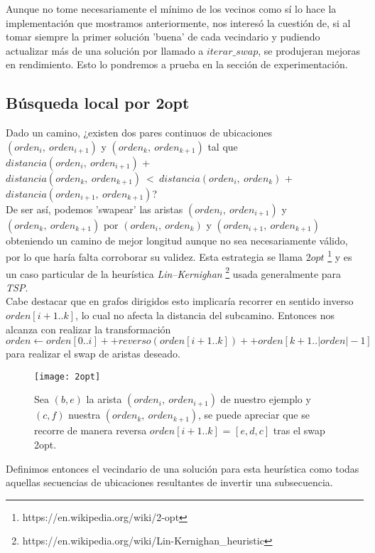     Aunque no tome necesariamente el mínimo de los vecinos como sí lo hace la implementación que mostramos anteriormente, nos interesó la cuestión de, si al tomar siempre la primer solución 'buena' de cada vecindario y pudiendo actualizar más de una solución por llamado a $iterar\_swap$, se produjeran mejoras en rendimiento. Esto lo pondremos a prueba en la sección de experimentación.

    \subsection{Búsqueda local por 2opt}

    Dado un camino, ¿existen dos pares continuos de ubicaciones $(orden_i,\ orden_{i+1})$ y $(orden_k,\ orden_{k+1})$ tal que $distancia(orden_i,\ orden_{i+1})$ + $distancia(orden_k,\ orden_{k+1}) \ < \ distancia(orden_i,\ orden_k)$ + $distancia(orden_{i+1},\ orden_{k+1})$?
    \\

    De ser así, podemos 'swapear' las aristas $(orden_i,\ orden_{i+1})$ y $(orden_k,\ orden_{k+1})$ por $(orden_i,\ orden_k)$ y $(orden_{i+1},\ orden_{k+1})$ obteniendo un camino de mejor longitud aunque no sea necesariamente válido, por lo que haría falta corroborar su validez. Esta estrategia se llama $2opt$ \footnote{https://en.wikipedia.org/wiki/2-opt} y es un caso particular de la heurística \emph{Lin–Kernighan} \footnote{https://en.wikipedia.org/wiki/Lin-Kernighan_heuristic} usada generalmente para \emph{TSP}.
    \\

    Cabe destacar que en grafos dirigidos esto implicaría recorrer en sentido inverso $orden[i+1..k]$, lo cual no afecta la distancia del subcamino. Entonces nos alcanza con realizar la transformación $orden \gets orden[0..i] ++ reverso(orden[i+1..k]) ++ orden[k+1..|orden|-1]$ para realizar el swap de aristas deseado.

    \begin{figure}[H]
        \centering
        \texttt{[image: 2opt]}
        \caption{Sea $(b,e)$ la arista $(orden_i,\ orden_{i+1})$ de nuestro ejemplo y $(c,f)$ nuestra $(orden_k,\ orden_{k+1})$, se puede apreciar que se recorre de manera reversa $orden[i+1..k]$ = $[e,d,c]$ tras el swap 2opt.}
        \label{fig:2opt}
    \end{figure}

    Definimos entonces el vecindario de una solución para esta heurística como todas aquellas secuencias de ubicaciones resultantes de invertir una subsecuencia.


